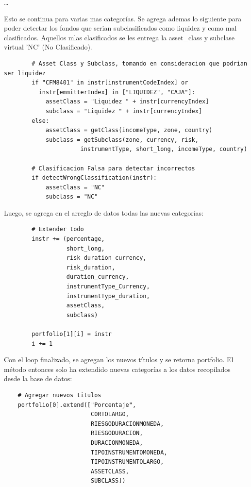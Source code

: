 \documentclass{article}
\begin{document}
\begin{itemize}
\begin{center} 
\dots
\end{center}

Esto se continua para varias mas categorías. Se agrega ademas lo siguiente para poder detectar los fondos que serian subclasificados como liquidez y como mal clasificados. Aquellos mlas clasificados se les entrega la asset\_class y subclase virtual 'NC' (No Clasificado).
\begin{lstlisting}
        # Asset Class y Subclass, tomando en consideracion que podrian ser liquidez
        if "CFM8401" in instr[instrumentCodeIndex] or 
          instr[emmitterIndex] in ["LIQUIDEZ", "CAJA"]:
            assetClass = "Liquidez " + instr[currencyIndex]
            subclass = "Liquidez " + instr[currencyIndex]
        else:
            assetClass = getClass(incomeType, zone, country)
            subclass = getSubclass(zone, currency, risk,
                      instrumentType, short_long, incomeType, country)

        # Clasificacion Falsa para detectar incorrectos
        if detectWrongClassification(instr):
            assetClass = "NC"
            subclass = "NC"
\end{lstlisting}

Luego, se agrega en el arreglo de datos todas las nuevas categorías:
\begin{lstlisting}
        # Extender todo
        instr += (percentage,
                  short_long,
                  risk_duration_currency,
                  risk_duration,
                  duration_currency,
                  instrumentType_Currency,
                  instrumentType_duration,
                  assetClass,
                  subclass)

        portfolio[1][i] = instr
        i += 1
\end{lstlisting}

Con el loop finalizado, se agregan los nuevos títulos y se retorna portfolio. El método entonces solo ha extendido nuevas categorías a los datos recopilados desde la base de datos:
\begin{lstlisting}
    # Agregar nuevos titulos
    portfolio[0].extend(["Porcentaje",
                         CORTOLARGO,
                         RIESGODURACIONMONEDA,
                         RIESGODURACION,
                         DURACIONMONEDA,
                         TIPOINSTRUMENTOMONEDA,
                         TIPOINSTRUMENTOLARGO,
                         ASSETCLASS,
                         SUBCLASS])


\end{lstlisting}
\end{itemize}
\end{document}

